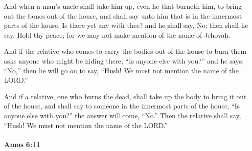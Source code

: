 			\begin{versebox}
					\item[BHS] 
					\item[LXX] 
					\item[ASV] And when a man's uncle shall take him up, even he that burneth him, to bring out the bones out of the house, and shall say unto him that is in the innermost parts of the house, Is there yet any with thee? and he shall say, No; then shall he say, Hold thy peace; for we may not make mention of the name of Jehovah.
					\item[NIV] And if the relative who comes to carry the bodies out of the house to burn them asks anyone who might be hiding there, “Is anyone else with you?” and he says, “No,” then he will go on to say, “Hush! We must not mention the name of the LORD.”
					\item[NRSV] And if a relative, one who burns the dead, shall take up the body to bring it out of the house, and shall say to someone in the innermost parts of the house, “Is anyone else with you?” the answer will come, “No.” Then the relative shall say, “Hush! We must not mention the name of the LORD.”
			\end{versebox}

		\paragraph{Amos 6:11} %
			\label{AMOS-6-11}

